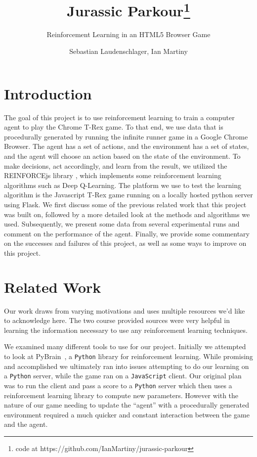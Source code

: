 \documentclass{scrartcl}
\title{Jurassic Parkour\footnote{code at
https://github.com/IanMartiny/jurassic-parkour}}
\subtitle{Reinforcement Learning in an HTML5 Browser Game}
\author{Sebastian Laudenschlager, Ian Martiny}
\date{}
\begin{document}
\maketitle

\section{Introduction}

The goal of this project is to use reinforcement learning to train a computer
agent to play the Chrome T-Rex game. To that end, we use data that is
procedurally generated by running the infinite runner game in a Google Chrome
Browser. The agent has a set of actions, and the environment has a set of
states, and the agent will choose an action based on the state of the
environment. To make decisions, act accordingly, and learn from the result, we
utilized the REINFORCEjs library \cite{reinforcejs}, which implements some
reinforcement learning algorithms such as Deep Q-Learning. The platform we use
to test the learning algorithm is the Javascript T-Rex game running on a
locally hosted python server using Flask. We first discuss some of the previous
related work that this project was built on, followed by a more detailed look
at the methods and algorithms we used. Subsequently, we present some data from
several experimental runs and comment on the performance of the agent. Finally,
we provide some commentary on the successes and failures of this project, as
well as some ways to improve on this project.

\section{Related Work}
Our work draws from varying motivations and uses multiple resources we'd like
to acknowledge here. The two course provided sources \cite{rltutorial, rlblog}
were very helpful in learning the information necessary to use any
reinforcement learning techniques.

We examined many different tools to use for our project. Initially we attempted
to look at PyBrain~\cite{pybrain}, a \texttt{Python} library for reinforcement
learning. While promising and accomplished we ultimately ran into issues
attempting to do our learning on a \texttt{Python} server, while the game ran on
a \texttt{JavaScript} client. Our original plan was to run the client and pass
a score to a \texttt{Python} server which then uses a reinforcement learning
library to compute new parameters. However with the nature of our game needing
to update the ``agent'' with a procedurally generated environment required a
much quicker and constant interaction between the game and the agent.
\end{document}
